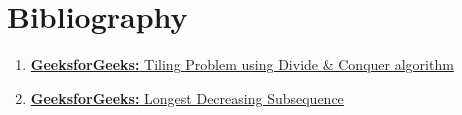 \documentclass[12pt]{report}
\begin{document}
    \section*{Bibliography}
    \begin{enumerate}
        \item
        \href{
            https://www.geeksforgeeks.org/tiling-problem-using-divide-and-conquer-algorithm/
        }{\textbf{GeeksforGeeks:} Tiling Problem using Divide \& Conquer algorithm}
        \item
        \href{
            https://www.geeksforgeeks.org/longest-decreasing-subsequence/
        }{\textbf{GeeksforGeeks:} Longest Decreasing Subsequence}
    \end{enumerate}
\end{document}
